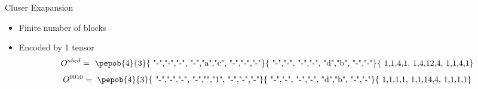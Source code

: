 \begin{frame}{Cluser Exapansion}
\begin{minipage}{0.49\textwidth}
         {

            \begin{itemize}
                \item Finite number of blocks
                \item Encoded by 1 tensor
                      \begin{equation}
                          O^{abcd} = \vcenter{ \hbox{ \pepob{4}{3}{{
                                              "-","-","-",
                                              "-","a","c",
                                              "-","-","-"}}{{
                                              "-","-",
                                              "-","-",
                                              "d","b",
                                              "-","-"}}{{
                                              1,1,4,1,
                                              1,4,12,4,
                                              1,1,4,1}} }}
                      \end{equation}
                      \begin{equation}
                          O^{0010} = \vcenter{ \hbox{ \pepob{4}{3}{{
                                              "-","-","-",
                                              "-","","1",
                                              "-","-","-"}}{{
                                              "-","-",
                                              "-","-",
                                              "d","b",
                                              "-","-"}}{{
                                              1,1,1,1,
                                              1,1,14,4,
                                              1,1,1,1}} }}
                      \end{equation}

            \end{itemize}

        }

         {
            \clustFullB
        }

    \end{minipage}
\end{frame}

